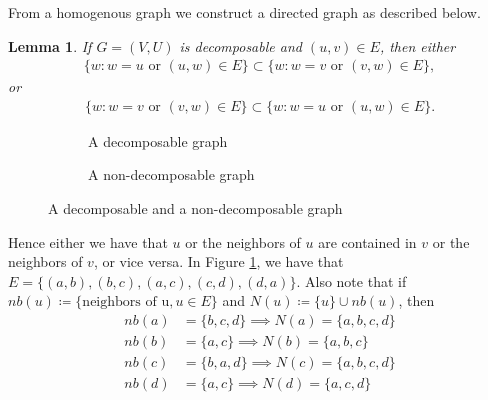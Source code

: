 \documentclass[12pt, leqno]{article}
\newtheorem{lemma}{Lemma}[]
\begin{document}
From a homogenous graph we construct a directed graph as described below. 
\begin{lemma}
If $G = (V,U)$ is decomposable and $(u,v) \in E$, then either 
\begin{align*}
\{w:w=u \text{ or } (u,w) \in E\} \subset \{w:w=v \text{ or } (v,w) \in E\}, 
\end{align*}
or
\begin{align*}
\{w:w=v \text{ or } (v,w) \in E\} \subset \{w:w=u \text{ or } (u,w) \in E\}.
\end{align*}
\end{lemma}
\begin{figure}
\centering
\begin{subfigure}{.4\textwidth}
\caption{A decomposable graph}
  \label{decomp}
\end{subfigure}%
\begin{subfigure}{.4\textwidth}
  \centering
{}
  \caption{A non-decomposable graph}
  \label{nondecomp}
\end{subfigure}
\caption{A decomposable and a non-decomposable graph}
\label{decomposablegraph}
\end{figure} 
Hence either we have that $u$ or the neighbors of $u$ are contained
in $v$ or the neighbors of $v$, or vice versa. In Figure \ref{decomp},
we have that $E = \{(a,b),(b,c),(a,c),(c,d),(d,a)\}$. Also note that
if $nb(u) \coloneqq \{\text{neighbors of u}, u \in E\}$ and $N(u)
\coloneqq \{u\} \cup nb(u)$,
then 
\begin{align*}
nb(a) &= \{b,c,d\} \implies N(a)  = \{a,b,c,d\} \\
nb(b) &= \{a,c\} \implies N(b)  = \{a,b,c\}\\
nb(c) &= \{b,a,d\}\implies N(c)  = \{a,b,c,d\}\\
nb(d) &= \{a,c\} \implies N(d)  = \{a,c,d\}
\end{align*}
\end{document}

